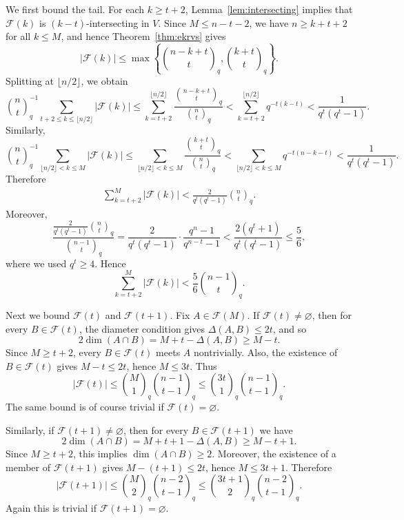 \documentclass[11pt]{article}
\theoremstyle{definition}
\newcommand{\qbinom}[2]{\genfrac{(}{)}{0pt}{}{#1}{#2}_q}
\begin{document}
We first bound the tail. 
For each $k\ge t+2$, Lemma~\ref{lem:intersecting} implies that $\mathcal F(k)$ is $(k-t)$-intersecting in $V$. 
Since $M\le n-t-2$, we have $n\ge k+t+2$ for all $k\le M$, and hence Theorem~\ref{thm:ekrvs} gives
\[
|\mathcal F(k)|
\le
\max\left\{
\qbinom{n-k+t}{t},
\qbinom{k+t}{t}
\right\}.
\]
Splitting at $\lfloor n/2\rfloor$, we obtain
\begin{equation*}
\qbinom{n}{t}^{-1}
\sum_{t+2\le k\le \lfloor n/2\rfloor}|\mathcal F(k)|
\le
\sum_{k=t+2}^{\lfloor n/2\rfloor}
\frac{\qbinom{n-k+t}{t}}{\qbinom{n}{t}} <
\sum_{k=t+2}^{\lfloor n/2\rfloor}q^{-t(k-t)}
<
\frac{1}{q^t(q^t-1)}.
\end{equation*}
Similarly,
\begin{equation*}
\qbinom{n}{t}^{-1}
\sum_{\lfloor n/2\rfloor< k\le M}|\mathcal F(k)|
\le
\sum_{\lfloor n/2\rfloor< k\le M}
\frac{\qbinom{k+t}{t}}{\qbinom{n}{t}} <
\sum_{\lfloor n/2\rfloor< k\le M}q^{-t(n-k-t)}
<
\frac{1}{q^t(q^t-1)}.
\end{equation*}
Therefore
\begin{align*}
\sum_{k=t+2}^{M}|\mathcal F(k)|
<
\frac{2}{q^t(q^t-1)}\qbinom{n}{t}.
\end{align*}
Moreover,
\begin{equation*}
\frac{\frac{2}{q^t(q^t-1)}\qbinom{n}{t}}{\qbinom{n-1}{t}}
=
\frac{2}{q^t(q^t-1)}
\cdot
\frac{q^n-1}{q^{n-t}-1} <
\frac{2(q^t+1)}{q^t(q^t-1)}
\le \frac56,
\end{equation*}
where we used $q^t\ge 4$. Hence
\begin{equation}\label{eq:typeA-tail-final}
\sum_{k=t+2}^{M}|\mathcal F(k)|<\frac56\qbinom{n-1}{t}.
\end{equation}

Next we bound $\mathcal F(t)$ and $\mathcal F(t+1)$. Fix $A\in\mathcal F(M)$. If $\mathcal F(t)\neq\varnothing$, then for every $B\in\mathcal F(t)$, the diameter condition gives $\Delta(A,B)\le 2t$, and so
\[
2\dim(A\cap B)=M+t-\Delta(A,B)\ge M-t.
\]
Since $M\ge t+2$, every $B\in\mathcal F(t)$ meets $A$ nontrivially. 
Also, the existence of $B\in\mathcal F(t)$ gives $M-t\le 2t$, hence $M\le 3t$. 
Thus
\begin{equation}\label{eq:typeA-Ft-bound}
|\mathcal F(t)|
\le
\qbinom{M}{1}\qbinom{n-1}{t-1}
\le
\qbinom{3t}{1}\qbinom{n-1}{t-1}.
\end{equation}
The same bound is of course trivial if $\mathcal F(t)=\varnothing$.

Similarly, if $\mathcal F(t+1)\neq\varnothing$, then for every $B\in\mathcal F(t+1)$ we have
\[
2\dim(A\cap B)=M+t+1-\Delta(A,B)\ge M-t+1.
\]
Since $M\ge t+2$, this implies $\dim(A\cap B)\ge 2$. 
Moreover, the existence of a member of $\mathcal F(t+1)$ gives $M-(t+1)\le 2t$, hence $M\le 3t+1$. 
Therefore
\begin{equation}\label{eq:typeA-Ftplus-bound}
|\mathcal F(t+1)|
\le
\qbinom{M}{2}\qbinom{n-2}{t-1}
\le
\qbinom{3t+1}{2}\qbinom{n-2}{t-1}.
\end{equation}
Again this is trivial if $\mathcal F(t+1)=\varnothing$.
\end{document}

